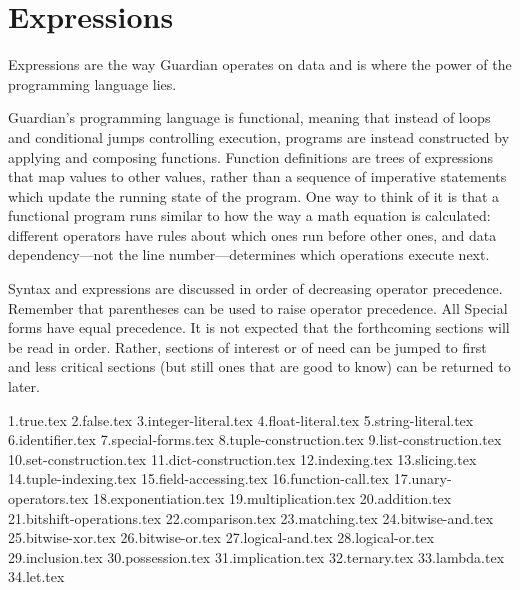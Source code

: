 
\section{Expressions}
{
	Expressions are the way Guardian operates on data and is where the power
	of the programming language lies.
	
	Guardian's programming language is functional, meaning that instead of
	loops and conditional jumps controlling
	execution, programs are
	instead constructed by applying and composing functions. Function
	definitions are trees of expressions that map values to other values,
	rather than a sequence of imperative statements which update
	the running state of the program. One way to think of it is that
	a functional program runs similar to how the way a math equation is
	calculated: different operators have rules about which ones run before
	other ones, and data dependency---not the line number---determines which
	operations execute next.
	
	Syntax and expressions are discussed in order of decreasing operator
	precedence. Remember that parentheses can be used to raise operator
	precedence. All Special forms have equal precedence.
	It is not expected that the forthcoming sections will be read
	in order. Rather, sections of interest or of need can be jumped to first
	and less critical sections (but still ones that are good to know) can be
	returned to later.
	
	{1.true.tex}
	{2.false.tex}
	{3.integer-literal.tex}
	{4.float-literal.tex}
	{5.string-literal.tex}
	{6.identifier.tex}
	{7.special-forms.tex}
	{8.tuple-construction.tex}
	{9.list-construction.tex}
	{10.set-construction.tex}
	{11.dict-construction.tex}
	{12.indexing.tex}
	{13.slicing.tex}
	{14.tuple-indexing.tex}
	{15.field-accessing.tex}
	{16.function-call.tex}
	{17.unary-operators.tex}
	{18.exponentiation.tex}
	{19.multiplication.tex}
	{20.addition.tex}
	{21.bitshift-operations.tex}
	{22.comparison.tex}
	{23.matching.tex}
	{24.bitwise-and.tex}
	{25.bitwise-xor.tex}
	{26.bitwise-or.tex}
	{27.logical-and.tex}
	{28.logical-or.tex}
	{29.inclusion.tex}
	{30.possession.tex}
	{31.implication.tex}
	{32.ternary.tex}
	{33.lambda.tex}
	{34.let.tex}
}











